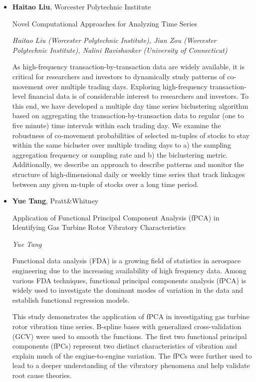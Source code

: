 \begin{itemize}
\item \textbf{Haitao Liu}, Worcester Polytechnic Institute

Novel Computational Approaches for Analyzing Time Series

\emph{\footnotesize Haitao Liu (Worcester Polytechnic Institute), Jian Zou (Worcester Polytechnic Institute), Nalini Ravishanker (University of Connecticut)}

As high-frequency transaction-by-transaction data are widely available, it is critical for researchers and investors to dynamically study patterns of co-movement over multiple trading days. Exploring high-frequency transaction-level financial data is of considerable interest to researchers and investors. To this end, we have developed a multiple day time series biclustering algorithm based on aggregating the transaction-by-transaction data to regular (one to five minute) time intervals within each trading day. We examine the robustness of co-movement probabilities of selected m-tuples of stocks to stay within the same bicluster over multiple trading days to a) the sampling aggregation frequency or sampling rate and b) the biclustering metric. Additionally, we describe an approach to describe patterns and monitor the structure of high-dimensional daily or weekly time series that track linkages between any given m-tuple of stocks over a long time period.

\item \textbf{Yue Tang}, Pratt\&Whitney

Application of Functional Principal Component Analysis (fPCA) in Identifying Gas Turbine Rotor Vibratory Characteristics

\emph{\footnotesize Yue Tang}

Functional data analysis (FDA) is a growing field of statistics in aerospace engineering due to the increasing availability of high frequency data. Among various FDA techniques, functional principal components analysis (fPCA) is widely used to investigate the dominant modes of variation in the data and establish functional regression models. 

This study demonstrates the application of fPCA in investigating gas turbine rotor vibration time series. B-spline bases with generalized cross-validation (GCV) were used to smooth the functions. The first two functional principal components (fPCs) represent two distinct characteristics of vibration and explain much of the engine-to-engine variation. The fPCs were further used to lead to a deeper understanding of the vibratory phenomena and help validate root cause theories. 

\end{itemize}

